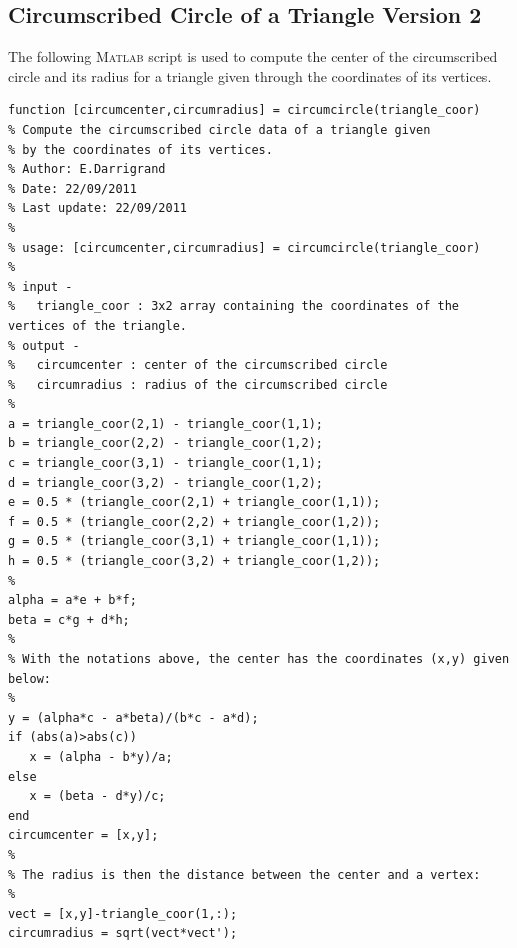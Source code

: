 \documentclass[11pt,a4paper,center,notitlepage]{article}
\numberwithin{equation}{section}
\begin{document}
\subsection{Circumscribed Circle of a Triangle Version 2}\label{sec5.5}
The following \textsc{Matlab} script is used to compute the center of the circumscribed circle and its radius for a triangle given through the coordinates of its vertices.
\begin{verbatim}
function [circumcenter,circumradius] = circumcircle(triangle_coor)
% Compute the circumscribed circle data of a triangle given 
% by the coordinates of its vertices.
% Author: E.Darrigrand
% Date: 22/09/2011
% Last update: 22/09/2011
%
% usage: [circumcenter,circumradius] = circumcircle(triangle_coor)
%
% input -
%   triangle_coor : 3x2 array containing the coordinates of the vertices of the triangle.  
% output - 
%   circumcenter : center of the circumscribed circle
%   circumradius : radius of the circumscribed circle
%
a = triangle_coor(2,1) - triangle_coor(1,1);
b = triangle_coor(2,2) - triangle_coor(1,2);
c = triangle_coor(3,1) - triangle_coor(1,1);
d = triangle_coor(3,2) - triangle_coor(1,2);
e = 0.5 * (triangle_coor(2,1) + triangle_coor(1,1));
f = 0.5 * (triangle_coor(2,2) + triangle_coor(1,2));
g = 0.5 * (triangle_coor(3,1) + triangle_coor(1,1));
h = 0.5 * (triangle_coor(3,2) + triangle_coor(1,2));
%
alpha = a*e + b*f;
beta = c*g + d*h;
%
% With the notations above, the center has the coordinates (x,y) given below:
%
y = (alpha*c - a*beta)/(b*c - a*d);
if (abs(a)>abs(c))
   x = (alpha - b*y)/a;
else
   x = (beta - d*y)/c;
end
circumcenter = [x,y];
% 
% The radius is then the distance between the center and a vertex:
%
vect = [x,y]-triangle_coor(1,:);
circumradius = sqrt(vect*vect');
\end{verbatim}
\end{document}

